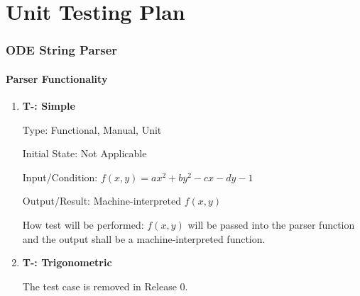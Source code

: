 \documentclass[12pt, titlepage]{article}
\newcounter{tnum} %
\begin{document}
\section{Unit Testing Plan}
		

\subsubsection{ODE String Parser}

\paragraph{Parser Functionality}

\begin{enumerate}

\item{\textbf{T-\thetnum \label{t-parser1}: Simple}}

Type: Functional, Manual, Unit 
					
Initial State: Not Applicable
					
Input/Condition: $f(x, y) = ax^2 + by^2 - cx - dy - 1$
					
Output/Result: Machine-interpreted $f(x, y)$
					
How test will be performed: $f(x, y)$ will be passed into the parser function and the output shall be a
machine-interpreted function.


\item{\textbf{T-\thetnum \label{t-parser1}: Trigonometric}}

The test case is removed in Release 0.

%					
%					
%					
%					

\end{enumerate}

  
\end{document}

